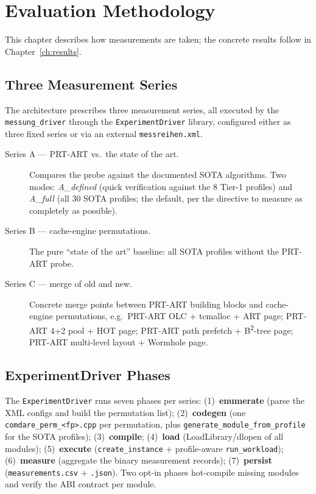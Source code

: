 \chapter{Evaluation Methodology}\label{ch:methodology}

This chapter describes how measurements are taken; the concrete results follow in
Chapter~\ref{ch:results}.

\section{Three Measurement Series}\label{sec:series}

The architecture prescribes three measurement series, all executed by the
\texttt{messung\_driver} through the \texttt{ExperimentDriver} library, configured either
as three fixed series or via an external \texttt{messreihen.xml}.

\begin{description}
  \item[Series A --- PRT-ART vs.\ the state of the art.] Compares the probe against the
        documented SOTA algorithms. Two modes: \emph{A\_defined} (quick verification
        against the 8 Tier-1 profiles) and \emph{A\_full} (all 30 SOTA profiles; the
        default, per the directive to measure as completely as possible).
  \item[Series B --- cache-engine permutations.] The pure ``state of the art'' baseline:
        all SOTA profiles without the PRT-ART probe.
  \item[Series C --- merge of old and new.] Concrete merge points between PRT-ART building
        blocks and cache-engine permutations, e.g.\ PRT-ART OLC + tcmalloc + ART page;
        PRT-ART 4+2 pool + HOT page; PRT-ART path prefetch + B\textsuperscript{2}-tree
        page; PRT-ART multi-level layout + Wormhole page.
\end{description}

\section{ExperimentDriver Phases}\label{sec:experimentdriver}

The \texttt{ExperimentDriver} runs seven phases per series: (1)~\textbf{enumerate} (parse
the XML configs and build the permutation list); (2)~\textbf{codegen} (one
\texttt{comdare\_perm\_<fp>.cpp} per permutation, plus
\texttt{generate\_module\_from\_profile} for the SOTA profiles); (3)~\textbf{compile};
(4)~\textbf{load} (LoadLibrary/dlopen of all modules); (5)~\textbf{execute}
(\texttt{create\_instance} + profile-aware \texttt{run\_workload}); (6)~\textbf{measure}
(aggregate the binary measurement records); (7)~\textbf{persist}
(\texttt{measurements.csv} + \texttt{.json}). Two opt-in phases hot-compile missing modules
and verify the ABI contract per module.

